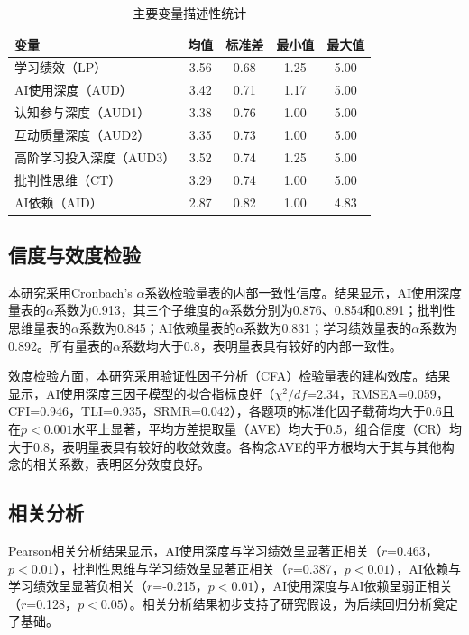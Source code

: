 \documentclass{njtech-thesis}
\begin{document}
\begin{table}[htbp]
  \centering
  \caption{主要变量描述性统计}
  \begin{tabular}{lcccc}
    \toprule
    变量 & 均值 & 标准差 & 最小值 & 最大值 \\
    \midrule
    学习绩效（LP） & 3.56 & 0.68 & 1.25 & 5.00 \\
    AI使用深度（AUD） & 3.42 & 0.71 & 1.17 & 5.00 \\
    认知参与深度（AUD1） & 3.38 & 0.76 & 1.00 & 5.00 \\
    互动质量深度（AUD2） & 3.35 & 0.73 & 1.00 & 5.00 \\
    高阶学习投入深度（AUD3） & 3.52 & 0.74 & 1.25 & 5.00 \\
    批判性思维（CT） & 3.29 & 0.74 & 1.00 & 5.00 \\
    AI依赖（AID） & 2.87 & 0.82 & 1.00 & 4.83 \\
    \bottomrule
  \end{tabular}
\end{table}

\subsection{信度与效度检验}

本研究采用Cronbach's $\alpha$系数检验量表的内部一致性信度。结果显示，AI使用深度量表的$\alpha$系数为0.913，其三个子维度的$\alpha$系数分别为0.876、0.854和0.891；批判性思维量表的$\alpha$系数为0.845；AI依赖量表的$\alpha$系数为0.831；学习绩效量表的$\alpha$系数为0.892。所有量表的$\alpha$系数均大于0.8，表明量表具有较好的内部一致性。

效度检验方面，本研究采用验证性因子分析（CFA）检验量表的建构效度。结果显示，AI使用深度三因子模型的拟合指标良好（$\chi^2/df$=2.34，RMSEA=0.059，CFI=0.946，TLI=0.935，SRMR=0.042），各题项的标准化因子载荷均大于0.6且在$p<0.001$水平上显著，平均方差提取量（AVE）均大于0.5，组合信度（CR）均大于0.8，表明量表具有较好的收敛效度。各构念AVE的平方根均大于其与其他构念的相关系数，表明区分效度良好。

\subsection{相关分析}

Pearson相关分析结果显示，AI使用深度与学习绩效呈显著正相关（$r$=0.463，$p<0.01$），批判性思维与学习绩效呈显著正相关（$r$=0.387，$p<0.01$），AI依赖与学习绩效呈显著负相关（$r$=-0.215，$p<0.01$），AI使用深度与AI依赖呈弱正相关（$r$=0.128，$p<0.05$）。相关分析结果初步支持了研究假设，为后续回归分析奠定了基础。
\end{document}
